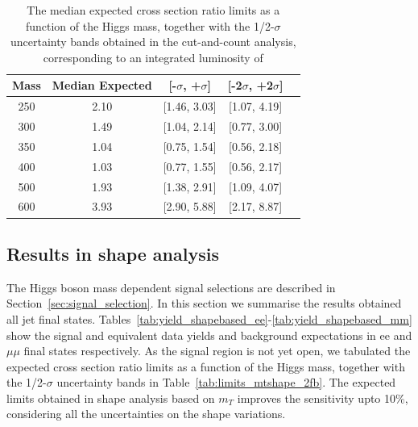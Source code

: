 
\begin{table}
\begin{center}
\begin{tabular}{ccccc}
\hline
Mass & Median Expected & [-$\sigma$, +$\sigma$] & [-2$\sigma$, +2$\sigma$]\\\hline
250 & 2.10 & [1.46, 3.03] & [1.07, 4.19] \\
300 & 1.49 & [1.04, 2.14] & [0.77, 3.00] \\
350 & 1.04 & [0.75, 1.54] & [0.56, 2.18] \\
400 & 1.03 & [0.77, 1.55] & [0.56, 2.17] \\
500 & 1.93 & [1.38, 2.91] & [1.09, 4.07] \\
600 & 3.93 & [2.90, 5.88] & [2.17, 8.87] \\
\hline
\end{tabular}
\end{center}
\caption{The median expected cross section ratio limits as a function 
of the Higgs mass, together with the 1/2-$\sigma$ uncertainty bands obtained in the cut-and-count analysis, corresponding to 
an integrated luminosity of \intlumi}
\label{tab:limits_cutbased_2fb}
\end{table}

\subsection{Results in shape analysis} 

The Higgs boson mass dependent signal selections are described in Section~\ref{sec:signal_selection}. 
In this section we summarise the results obtained all jet final states. 
Tables~\ref{tab:yield_shapebased_ee}-\ref{tab:yield_shapebased_mm} show the signal and 
equivalent data yields and background expectations in ee and $\mu\mu$ final states respectively. 
As the signal region is not yet open, we tabulated the expected cross section ratio limits as a function 
of the Higgs mass, together with the 1/2-$\sigma$ uncertainty bands in Table~\ref{tab:limits_mtshape_2fb}. 
The expected limits obtained in shape analysis based on $m_T$ improves the sensitivity upto 10\%, 
considering all the uncertainties on the shape variations. 



